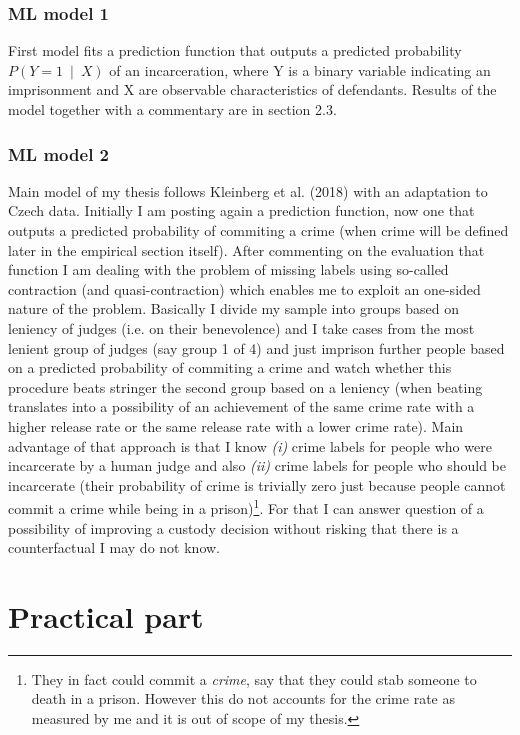 \documentclass[12pt, twoside,openany]{book} %
\begin{document}
\subsection{ML model 1}
First model fits a prediction function that outputs a predicted probability $P(Y=1~\mid~ X)$ of an incarceration, where Y is a binary variable indicating an imprisonment and X are observable characteristics of defendants. Results of the model together with a commentary are in section 2.3.

\subsection{ML model 2}
Main model of my thesis follows Kleinberg et al. (2018) with an adaptation to Czech data. Initially I am posting again a prediction function, now one that outputs a predicted probability of commiting a crime (when crime will be defined later in the empirical section itself). After commenting on the evaluation that function I am dealing with the problem of missing labels using so-called contraction (and quasi-contraction) which enables me to exploit an one-sided nature of the problem. Basically I divide my sample into groups based on leniency of judges (i.e. on their benevolence) and I take cases from the most lenient group of judges (say group 1 of 4) and just imprison further people based on a predicted probability of commiting a crime and watch whether this procedure beats stringer the second group based on a leniency (when beating translates into a possibility of an achievement of the same crime rate with a higher release rate or the same release rate with a lower crime rate). Main advantage of that approach is that I know \textit{(i)} crime labels for people who were incarcerate by a human judge and also \textit{(ii)} crime labels for people who should be incarcerate (their probability of crime is trivially zero just because people cannot commit a crime while being in a prison)\footnote{They in fact could commit a \textit{crime}, say that they could stab someone to death in a prison. However this do not accounts for the crime rate as measured by me and it is out of scope of my thesis.}. For that I can answer question of a possibility of improving a custody decision without risking that there is a counterfactual I may do not know. \newline






\chapter{Practical part}        %
\label{2}
\end{document}
